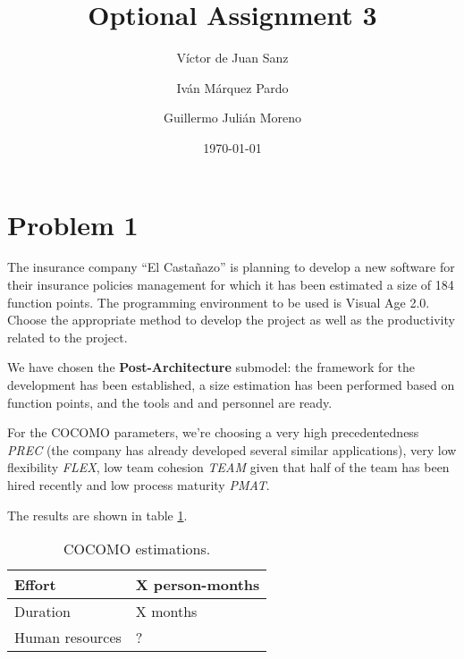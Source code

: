 \documentclass{article}
\title{Optional Assignment 3}
\date{\today}
\author{V\'ictor de Juan Sanz \and Iv\'an M\'arquez Pardo\and Guillermo Juli\'an Moreno}
\newcommand{\seprule}{{\color{gray} \noindent \hspace{40pt} \hrulefill \hspace{40pt} \vspace{13pt}}}
\begin{document}
\maketitle

\section{Problem 1}

The insurance company “El Casta\~nazo” is planning to develop a new software for their
insurance policies management for which it has been estimated a size of 184 function
points. The programming environment to be used is Visual Age 2.0. Choose the appropriate method to develop the project as well as the productivity related to the project.

\seprule

We have chosen the \textbf{Post-Architecture} submodel: the framework for the development has been established, a size estimation has been performed based on function points, and the tools and and personnel are ready.

For the COCOMO parameters, we're choosing a very high precedentedness \textit{PREC} (the company has already developed several similar applications), very low flexibility \textit{FLEX}, low team cohesion \textit{TEAM} given that half of the team has been hired recently and low process maturity \textit{PMAT}.

The results are shown in table \ref{tblProblem1}.


\begin{table}[hbtp]
\centering
\begin{tabular}{l|l}
Effort & X person-months \\ \hline
Duration & X months \\ \hline
Human resources & ?
\end{tabular}
\caption{COCOMO estimations.}
\label{tblProblem1}
\end{table}
\end{document}
